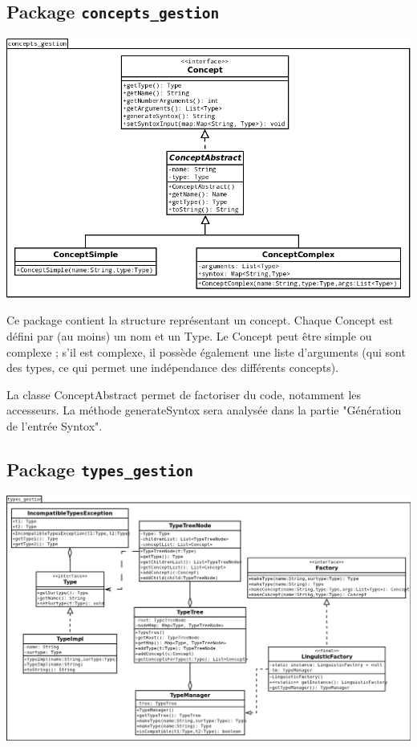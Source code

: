 \documentclass[12pt]{report}
\begin{document}
\subsection{Package \texttt{concepts\_gestion}}

\begin{center}
\includegraphics[scale=0.5]{DiagLinguistic_concepts_gestion.png}
\end{center}

Ce package contient la structure représentant un concept. Chaque Concept est défini par (au moins) un nom et un Type. Le Concept peut être simple ou complexe ; s'il est complexe, il possède également une liste d'arguments (qui sont des types, ce qui permet une indépendance des différents concepts). %

La classe ConceptAbstract permet de factoriser du code, notamment les accesseurs.
La méthode generateSyntox sera analysée dans la partie "Génération de l'entrée Syntox".

\subsection{Package \texttt{types\_gestion}}

\begin{center}
\includegraphics[scale=0.43]{DiagLinguistic_types_gestion.png}
\end{center}
\end{document}
